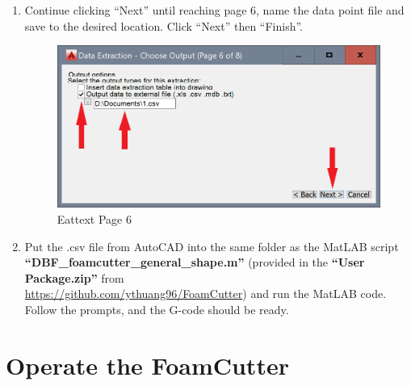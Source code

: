 \documentclass[titlepage,12pt,letter]{report}
\numberwithin{equation}{chapter}
\begin{document}
\begin{enumerate}[noitemsep,topsep=0pt]
	\item Continue clicking ``Next'' until reaching page 6, name the data point file and save to the desired location. Click ``Next'' then ``Finish''.
	\begin{figure} [H]
		\includegraphics[width = 0.6\linewidth]{./Figures/general_shape/cad9.png}
		\caption{Eattext Page 6}
	\end{figure}
	
	\item Put the .csv file from AutoCAD into the same folder as the MatLAB script \\ \textbf{``DBF\_foamcutter\_general\_shape.m''} (provided in the \textbf{``User Package.zip''} from \\ \href{https://github.com/ythuang96/FoamCutter}{https://github.com/ythuang96/FoamCutter}) and run the MatLAB code. Follow the prompts, and the G-code should be ready.
	
	
\end{enumerate}

\newpage




\newpage
\chapter{Operate the FoamCutter}
\end{document}
